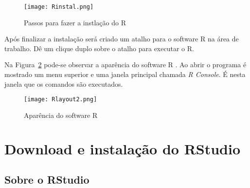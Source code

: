 \documentclass[11pt,fleqn]{book} %
\begin{document}
\begin{figure}[t!]
\centering\texttt{[image: Rinstal.png]}
\setlength{\abovecaptionskip}{0.5pt}
\caption{Passos para fazer a instlação do R}
\label{fig:Rinstal} %
\end{figure} 



Após finalizar a instalação será criado um atalho para o software R na área de trabalho. Dê um clique duplo sobre o atalho para executar o R.



Na Figura~\ref{fig:Rlayout} pode-se observar a aparência do software R . Ao abrir o programa é mostrado um menu superior e uma janela principal chamada {\itshape R Console}. É nesta janela que os comandos são executados. 


\begin{figure}[t!]
\centering\texttt{[image: Rlayout2.png]}
\setlength{\abovecaptionskip}{0.5pt}
\caption{Aparência do software R}
\label{fig:Rlayout} %
\end{figure}






\chapter{Download e instalação do RStudio}


\section{Sobre o RStudio}
\end{document}
